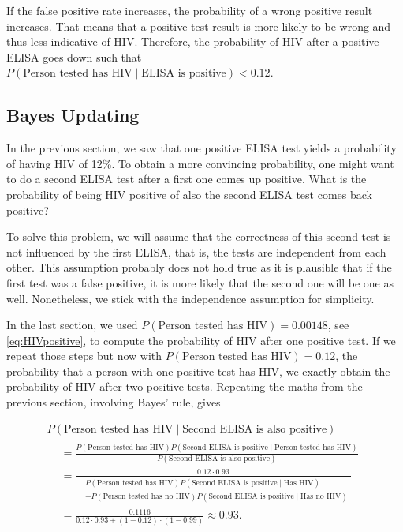 \documentclass[]{book}
\theoremstyle{definition}
\theoremstyle{definition}
\theoremstyle{definition}
\theoremstyle{remark}
\begin{document}
If the false positive rate increases, the probability of a wrong
positive result increases. That means that a positive test result is
more likely to be wrong and thus less indicative of HIV. Therefore, the
probability of HIV after a positive ELISA goes down such that
\(P(\text{Person tested has HIV} \mid \text{ELISA is positive}) < 0.12\).

\subsection{Bayes Updating}\label{bayes-updating}

In the previous section, we saw that one positive ELISA test yields a
probability of having HIV of 12\%. To obtain a more convincing
probability, one might want to do a second ELISA test after a first one
comes up positive. What is the probability of being HIV positive of also
the second ELISA test comes back positive?

To solve this problem, we will assume that the correctness of this
second test is not influenced by the first ELISA, that is, the tests are
independent from each other. This assumption probably does not hold true
as it is plausible that if the first test was a false positive, it is
more likely that the second one will be one as well. Nonetheless, we
stick with the independence assumption for simplicity.

In the last section, we used
\(P(\text{Person tested has HIV}) = 0.00148\), see \eqref{eq:HIVpositive},
to compute the probability of HIV after one positive test. If we repeat
those steps but now with \(P(\text{Person tested has HIV}) = 0.12\), the
probability that a person with one positive test has HIV, we exactly
obtain the probability of HIV after two positive tests. Repeating the
maths from the previous section, involving Bayes' rule, gives

\begin{multline}
  P(\text{Person tested has HIV} \mid \text{Second ELISA is also positive}) \\
  \begin{split}
  &= \frac{P(\text{Person tested has HIV}) P(\text{Second ELISA is positive} \mid \text{Person tested has HIV})}{P(\text{Second ELISA is also positive})} \\
  &= \frac{0.12 \cdot 0.93}{
  \begin{split}
  &P(\text{Person tested has HIV}) P(\text{Second ELISA is positive} \mid \text{Has HIV}) \\
  &+ P(\text{Person tested has no HIV}) P(\text{Second ELISA is positive} \mid \text{Has no HIV})
  \end{split}
  } \\
  &= \frac{0.1116}{0.12 \cdot 0.93 + (1 - 0.12)\cdot (1 - 0.99)} \approx 0.93.
  \end{split}
  \label{eq:Bayes-updating}
\end{multline}
\end{document}
